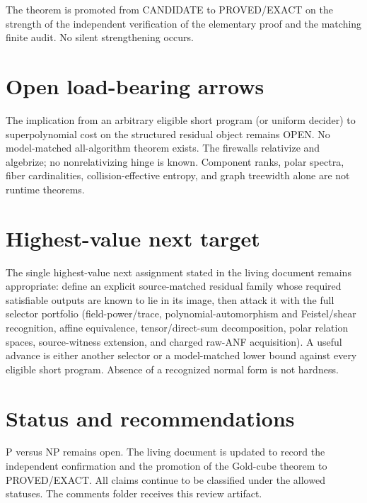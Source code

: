 \documentclass[11pt]{article}
\begin{document}
The theorem is promoted from CANDIDATE to PROVED/EXACT on the strength of the independent verification of the elementary proof and the matching finite audit. No silent strengthening occurs.

\section{Open load-bearing arrows}
The implication from an arbitrary eligible short program (or uniform decider) to superpolynomial cost on the structured residual object remains OPEN. No model-matched all-algorithm theorem exists. The firewalls relativize and algebrize; no nonrelativizing hinge is known. Component ranks, polar spectra, fiber cardinalities, collision-effective entropy, and graph treewidth alone are not runtime theorems.

\section{Highest-value next target}
The single highest-value next assignment stated in the living document remains appropriate: define an explicit source-matched residual family whose required satisfiable outputs are known to lie in its image, then attack it with the full selector portfolio (field-power/trace, polynomial-automorphism and Feistel/shear recognition, affine equivalence, tensor/direct-sum decomposition, polar relation spaces, source-witness extension, and charged raw-ANF acquisition). A useful advance is either another selector or a model-matched lower bound against every eligible short program. Absence of a recognized normal form is not hardness.

\section{Status and recommendations}
P versus NP remains open. The living document is updated to record the independent confirmation and the promotion of the Gold-cube theorem to PROVED/EXACT. All claims continue to be classified under the allowed statuses. The comments folder receives this review artifact.

\end{document}
